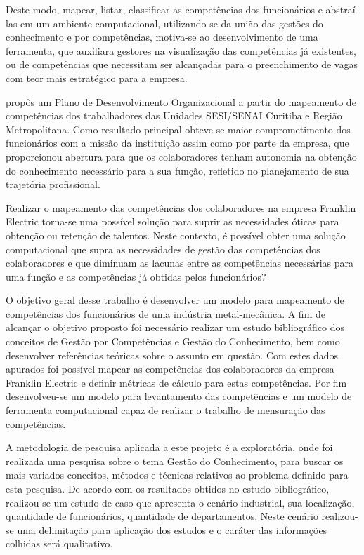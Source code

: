 Deste modo, mapear, listar, classificar as competências dos funcionários e abstraí-las em um ambiente computacional, utilizando-se da união das gestões do conhecimento e por competências, motiva-se ao desenvolvimento de uma ferramenta, que auxiliara gestores na visualização das competências já existentes, ou de competências que necessitam ser alcançadas para o preenchimento de vagas com teor mais estratégico para a empresa.

 propôs um Plano de Desenvolvimento Organizacional a partir do mapeamento de competências dos trabalhadores das Unidades SESI/SENAI Curitiba e Região Metropolitana. Como resultado principal obteve-se maior comprometimento dos funcionários com a missão da instituição assim como por parte da empresa, que proporcionou abertura para que os colaboradores tenham autonomia na obtenção do conhecimento necessário para a sua função, refletido no planejamento de sua trajetória profissional.

Realizar o mapeamento das competências dos colaboradores na empresa Franklin Electric torna-se uma possível solução para suprir as necessidades óticas para obtenção ou retenção de talentos. Neste contexto, é possível obter uma solução computacional que supra as necessidades de gestão das competências dos colaboradores e que diminuam as lacunas entre as competências necessárias para uma função e as competências já obtidas pelos funcionários?

O objetivo geral desse trabalho é desenvolver um modelo para mapeamento de competências dos funcionários de uma indústria metal-mecânica. A fim de alcançar o objetivo proposto foi necessário realizar um estudo bibliográfico dos conceitos de Gestão por Competências e Gestão do Conhecimento, bem como desenvolver referências teóricas sobre o assunto em questão. Com estes dados apurados foi possível mapear as competências dos colaboradores da empresa Franklin Electric e definir métricas de cálculo para estas competências. Por fim desenvolveu-se um modelo para levantamento das competências e um modelo de ferramenta computacional capaz de realizar o trabalho de mensuração das competências.

A metodologia de pesquisa aplicada a este projeto é a exploratória, onde foi realizada uma pesquisa sobre o tema Gestão do Conhecimento, para buscar os mais variados conceitos, métodos e técnicas relativos ao problema definido para esta pesquisa. De acordo com os resultados obtidos no estudo bibliográfico, realizou-se um estudo de caso que apresenta o cenário industrial, sua localização, quantidade de funcionários, quantidade de departamentos. Neste cenário realizou-se uma delimitação para aplicação dos estudos e o caráter das informações colhidas será qualitativo.

